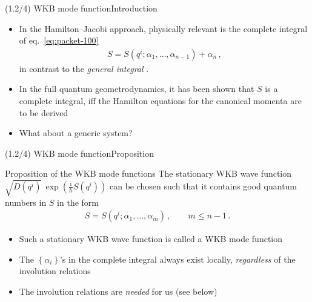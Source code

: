 \documentclass[mathserif]{beamer}
\newcommand{\cbr}[1]{{\left\{#1\right\}}}
\newcommand{\rfun}[2]{#1\mathopen{}\left(#2\right)\mathclose{}}
\newcommand\mi{\mathrm{i}} %
\begin{document}
\begin{frame}{(1.2/4) WKB mode function}{Introduction}
\begin{itemize}
    \item In the Hamilton--Jacobi approach, physically relevant is the \alert{complete integral} of eq.\ \eqref{eq:packet-100}
\begin{align}
    S = \rfun{S}{q^i; \alpha_1, \ldots, \alpha_{n-1}} + \alpha_n\,,
    \label{eq:packet-150}
\end{align}
    in contrast to the \emph{general integral} .
    
    \item
    In the full quantum geometrodynamics, it has been shown that $S$ is a complete integral, iff the Hamilton equations for the canonical momenta are to be derived 
    
    \item
    What about a generic system?
\end{itemize}
\end{frame}

\begin{frame}{(1.2/4) WKB mode function}{Proposition}
\begin{alertblock}{Proposition of the WKB mode functions}
    The stationary WKB wave function $\sqrt{\rfun{D}{q^i}}\,
    \rfun{\exp}{\frac{\mi}{\hslash} \rfun{S}{q^i}}$ can be chosen such that it contains good quantum numbers in $S$ in the form
    \begin{align}
    S = \rfun{S}{q^i; \alpha_1, \ldots, \alpha_{m}}\,, \qquad m \le n-1\,.
\end{align}
\end{alertblock}
\begin{itemize}
    \item Such a stationary WKB wave function is called a \alert{WKB mode function}
    \item The $\cbr{\alpha_i}$'s in the complete integral always exist locally, \emph{regardless} of the involution relations
    \item The involution relations are \emph{needed} for us (see below)
\end{itemize}
\end{frame}
\end{document}

